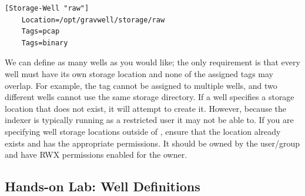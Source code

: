 \begin{Verbatim}[breaklines=true]
[Storage-Well "raw"]
    Location=/opt/gravwell/storage/raw
    Tags=pcap
    Tags=binary
\end{Verbatim}

We can define as many wells as you would like; the only requirement is
that every well must have its own storage location and none of the
assigned tags may overlap. For example, the tag  cannot be
assigned to multiple wells, and two different wells cannot use the same
storage directory. If a well specifies a storage location that does not
exist, it will attempt to create it. However, because the indexer is
typically running as a restricted user it may not be able to. If you
are specifying well storage locations outside of
, ensure that the location already exists and has the
appropriate permissions. It should be owned by the user/group
 and have RWX permissions enabled for the owner.

\clearpage
\subsection{Hands-on Lab: Well Definitions}

